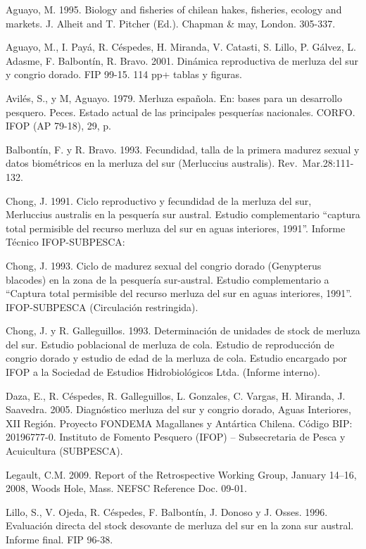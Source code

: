 \documentclass[
  spanish,
]{article}
\begin{document}
Aguayo, M. 1995. Biology and fisheries of chilean hakes, fisheries,
ecology and markets. J. Alheit and T. Pitcher (Ed.). Chapman \& may,
London. 305-337.

Aguayo, M., I. Payá, R. Céspedes, H. Miranda, V. Catasti, S. Lillo, P.
Gálvez, L. Adasme, F. Balbontín, R. Bravo. 2001. Dinámica reproductiva
de merluza del sur y congrio dorado. FIP 99-15. 114 pp+ tablas y
figuras.

Avilés, S., y M, Aguayo. 1979. Merluza española. En: bases para un
desarrollo pesquero. Peces. Estado actual de las principales pesquerías
nacionales. CORFO. IFOP (AP 79-18), 29, p.

Balbontín, F. y R. Bravo. 1993. Fecundidad, talla de la primera madurez
sexual y datos biométricos en la merluza del sur (Merluccius australis).
Rev.~Mar.28:111-132.

Chong, J. 1991. Ciclo reproductivo y fecundidad de la merluza del sur,
Merluccius australis en la pesquería sur austral. Estudio complementario
``captura total permisible del recurso merluza del sur en aguas
interiores, 1991''. Informe Técnico IFOP-SUBPESCA:

Chong, J. 1993. Ciclo de madurez sexual del congrio dorado (Genypterus
blacodes) en la zona de la pesquería sur-austral. Estudio complementario
a ``Captura total permisible del recurso merluza del sur en aguas
interiores, 1991''. IFOP-SUBPESCA (Circulación restringida).

Chong, J. y R. Galleguillos. 1993. Determinación de unidades de stock de
merluza del sur. Estudio poblacional de merluza de cola. Estudio de
reproducción de congrio dorado y estudio de edad de la merluza de cola.
Estudio encargado por IFOP a la Sociedad de Estudios Hidrobiológicos
Ltda. (Informe interno).

Daza, E., R. Céspedes, R. Galleguillos, L. Gonzales, C. Vargas, H.
Miranda, J. Saavedra. 2005. Diagnóstico merluza del sur y congrio
dorado, Aguas Interiores, XII Región. Proyecto FONDEMA Magallanes y
Antártica Chilena. Código BIP: 20196777-0. Instituto de Fomento Pesquero
(IFOP) -- Subsecretaria de Pesca y Acuicultura (SUBPESCA).

Legault, C.M. 2009. Report of the Retrospective Working Group, January
14--16, 2008, Woods Hole, Mass. NEFSC Reference Doc. 09-01.

Lillo, S., V. Ojeda, R. Céspedes, F. Balbontín, J. Donoso y J. Osses.
1996. Evaluación directa del stock desovante de merluza del sur en la
zona sur austral. Informe final. FIP 96-38.
\end{document}
